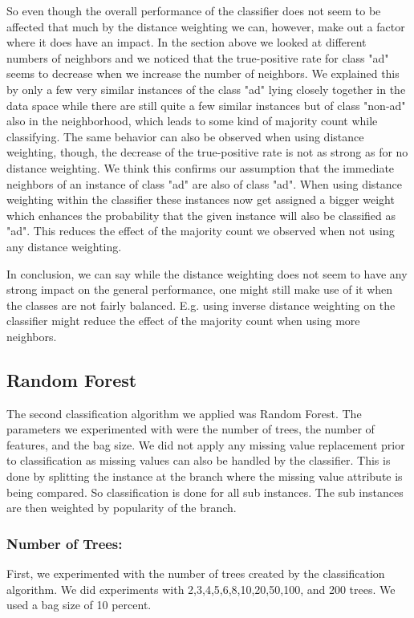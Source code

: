 \documentclass{article}
\begin{document}
So even though the overall performance of the classifier does not seem to be affected that much by the distance weighting we can, however, make out a factor where it does have an impact. In the section above we looked at different numbers of neighbors and we noticed that the true-positive rate for class "ad" seems to decrease when we increase the number of neighbors. We explained this by only a few very similar instances of the class "ad" lying closely together in the data space while there are still quite a few similar instances but of class "non-ad" also in the neighborhood, which leads to some kind of majority count while classifying. The same behavior can also be observed when using distance weighting, though, the decrease of the true-positive rate is not as strong as for no distance weighting. We think this confirms our assumption that the immediate neighbors of an instance of class "ad" are also of class "ad". When using distance weighting within the classifier these instances now get assigned a bigger weight which enhances the probability that the given instance will also be classified as "ad". This reduces the effect of the majority count we observed when not using any distance weighting.

In conclusion, we can say while the distance weighting does not seem to have any strong impact on the general performance, one might still make use of it when the classes are not fairly balanced. E.g. using inverse distance weighting on the classifier might reduce the effect of the majority count when using more neighbors.


\subsection{Random Forest}
The second classification algorithm we applied was Random Forest. The parameters we experimented with were the number of trees, the number of features, and the bag size. We did not apply any missing value replacement prior to classification as missing values can also be handled by the classifier. This is done by splitting the instance at the branch where the missing value attribute is being compared. So classification is done for all sub instances. The sub instances are then weighted by popularity of the branch. 

\subsubsection{Number of Trees:}
First, we experimented with the number of trees created by the classification algorithm. We did experiments with 2,3,4,5,6,8,10,20,50,100, and 200 trees. We used a bag size of 10 percent.
\end{document}
